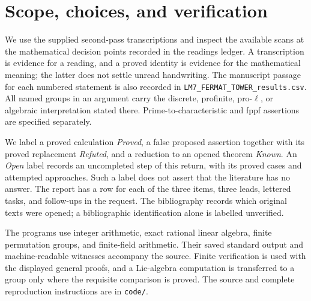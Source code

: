\documentclass[11pt,a4paper]{article}
\begin{document}
\newpage
\tableofcontents

\section{Scope, choices, and verification}
We use the supplied second-pass transcriptions and inspect the available
scans at the mathematical decision points recorded in the readings ledger.
A transcription is evidence for a reading, and a proved identity is evidence
for the mathematical meaning; the latter does not settle unread handwriting.
The manuscript passage for each numbered statement is also recorded in
\texttt{LM7\_FERMAT\_TOWER\_results.csv}. All named groups in an argument
carry the discrete, profinite, pro-$\ell$, or algebraic interpretation stated
there. Prime-to-characteristic and fppf assertions are specified separately.

We label a proved calculation \emph{Proved}, a false proposed assertion
together with its proved replacement \emph{Refuted}, and a reduction to an
opened theorem \emph{Known}. An \emph{Open} label records an uncompleted step
of this return, with its proved cases and attempted approaches. Such a label
does not assert that the literature has no answer. The report has a row for
each of the three items, three leads, lettered tasks, and follow-ups in the
request. The bibliography records which original texts were opened; a
bibliographic identification alone is labelled unverified.

The programs use integer arithmetic, exact rational linear algebra, finite
permutation groups, and finite-field arithmetic. Their saved standard output
and machine-readable witnesses accompany the source. Finite verification is
used with the displayed general proofs, and a Lie-algebra computation is
transferred to a group only where the requisite comparison is proved.
The source and complete reproduction instructions are in \texttt{code/}.
















\clearpage


\end{document}
